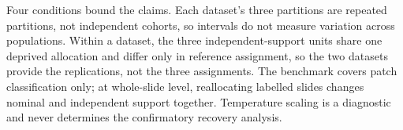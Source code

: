 \documentclass[11pt]{article}
\begin{document}
Four conditions bound the claims. Each dataset's three partitions are repeated partitions, not independent cohorts, so intervals do not measure variation across populations. Within a dataset, the three independent-support units share one deprived allocation and differ only in reference assignment, so the two datasets provide the replications, not the three assignments. The benchmark covers patch classification only; at whole-slide level, reallocating labelled slides changes nominal and independent support together. Temperature scaling is a diagnostic and never determines the confirmatory recovery analysis.

\newpage
\appendix
{}
{}



\clearpage


\end{document}
